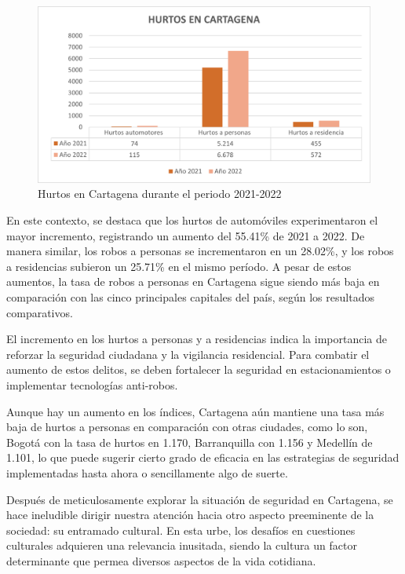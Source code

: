 \documentclass[letterpaper, 12pt]{article}
\begin{document}
\begin{figure}[H]
    \begin{center}
        \includegraphics[width=.8\linewidth]{./Images/Graph.HurtosCartagena.png}
        \caption{Hurtos en Cartagena durante el periodo 2021-2022}
        \label{fig:Graph.HurtosCartagena}
    \end{center}
\end{figure}

En este contexto, se destaca que los hurtos de automóviles
experimentaron el mayor incremento, registrando un aumento
del 55.41\% de 2021 a 2022. De manera similar, los robos a
personas se incrementaron en un 28.02\%, y los robos a
residencias subieron un 25.71\% en el mismo período. A
pesar de estos aumentos, la tasa de robos a personas en
Cartagena sigue siendo más baja en comparación con las
cinco principales capitales del país, según los resultados
comparativos.

El incremento en los hurtos a personas y a residencias
indica la importancia de reforzar la seguridad ciudadana y
la vigilancia residencial. Para combatir el aumento de
estos delitos, se deben fortalecer la seguridad en
estacionamientos o implementar tecnologías anti-robos.

Aunque hay un aumento en los índices, Cartagena aún
mantiene una tasa más baja de hurtos a personas en
comparación con otras ciudades, como lo son, Bogotá con la
tasa de hurtos en 1.170, Barranquilla con 1.156 y Medellín
de 1.101, lo que puede sugerir cierto grado de eficacia en
las estrategias de seguridad implementadas hasta ahora o
sencillamente algo de suerte.


\nocite{necesidades}

Después de meticulosamente explorar la situación de
seguridad en Cartagena, se hace ineludible dirigir nuestra
atención hacia otro aspecto preeminente de la sociedad: su
entramado cultural. En esta urbe, los desafíos en
cuestiones culturales adquieren una relevancia inusitada,
siendo la cultura un factor determinante que permea
diversos aspectos de la vida cotidiana.
\end{document}
